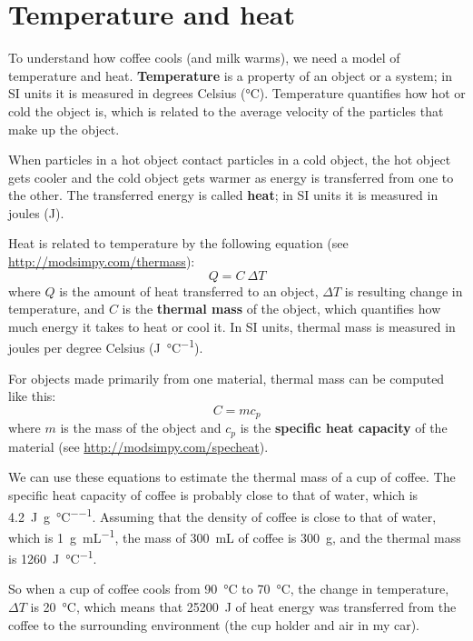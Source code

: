 \documentclass[12pt]{book}
\theoremstyle{exercise}
\begin{document}
\section{Temperature and heat}

To understand how coffee cools (and milk warms), we need a model of temperature and heat.  {\bf Temperature} is a property of an object or a system; in SI units it is measured in degrees Celsius (\si{\celsius}).  Temperature quantifies how hot or cold the object is, which is related to the average velocity of the particles that make up the object.


When particles in a hot object contact particles in a cold object, the hot object gets cooler and the cold object gets warmer as energy is transferred from one to the other.  
The transferred energy is called {\bf heat}; in SI units it is measured in joules (\si{\joule}).


Heat is related to temperature by the following equation (see \url{http://modsimpy.com/thermass}):
%
\[ Q = C~\Delta T \]
%
where $Q$ is the amount of heat transferred to an object, $\Delta T$ is resulting change in temperature, and $C$ is the {\bf thermal mass} of the object, which quantifies how much energy it takes to heat or cool it.  
In SI units, thermal mass is measured in joules per degree Celsius (\si{\joule\per\celsius}).


For objects made primarily from one material, thermal mass can be computed like this:
%
\[ C = m c_p \]
%
where $m$ is the mass of the object and $c_p$ is the {\bf specific heat capacity} of the material (see \url{http://modsimpy.com/specheat}).


We can use these equations to estimate the thermal mass of a cup of coffee.  The specific heat capacity of coffee is probably close to that of water, which is \SI{4.2}{\joule\per\gram\per\celsius}.  Assuming that the density of coffee is close to that of water, which is \SI{1}{\gram\per\milli\liter}, the mass of \SI{300}{\milli\liter} of coffee is \SI{300}{\gram}, and the thermal mass is \SI{1260}{\joule\per\celsius}.


So when a cup of coffee cools from \SI{90}{\celsius} to \SI{70}{\celsius}, the change in temperature, $\Delta T$ is \SI{20}{\celsius}, which means that \SI{25200}{\joule} of heat energy was transferred from the coffee to the surrounding environment (the cup holder and air in my car).
\end{document}
